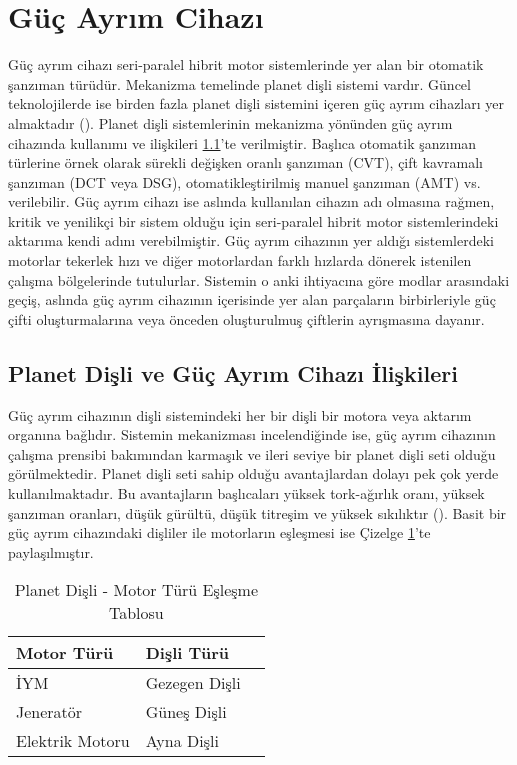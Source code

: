 \section{Güç Ayrım Cihazı}
\label{gucayrimcihazi}
Güç ayrım cihazı seri-paralel hibrit motor sistemlerinde yer alan bir otomatik şanzıman türüdür. Mekanizma temelinde
planet dişli sistemi vardır. Güncel teknolojilerde ise birden fazla planet dişli sistemini içeren güç ayrım cihazları yer almaktadır (\cite{gucayrimcihaziref}).
Planet dişli sistemlerinin mekanizma yönünden güç ayrım cihazında kullanımı ve ilişkileri \ref{PlanetDisliLiteratur}'te verilmiştir.
Başlıca otomatik şanzıman türlerine örnek olarak sürekli değişken oranlı şanzıman (CVT), çift kavramalı şanzıman (DCT veya DSG), otomatikleştirilmiş manuel şanzıman (AMT) vs. verilebilir.
Güç ayrım cihazı ise aslında kullanılan cihazın adı olmasına rağmen, kritik ve yenilikçi bir sistem olduğu için seri-paralel hibrit motor sistemlerindeki aktarıma kendi adını 
verebilmiştir. Güç ayrım cihazının yer aldığı sistemlerdeki motorlar tekerlek hızı ve diğer motorlardan farklı
hızlarda dönerek istenilen çalışma bölgelerinde tutulurlar. Sistemin o anki ihtiyacına göre modlar arasındaki geçiş, aslında güç ayrım 
cihazının içerisinde yer alan parçaların birbirleriyle güç çifti oluşturmalarına veya önceden oluşturulmuş çiftlerin ayrışmasına dayanır. 


\subsection{Planet Dişli ve Güç Ayrım Cihazı İlişkileri}
\label{PlanetDisliLiteratur}

Güç ayrım cihazının dişli sistemindeki her bir dişli bir motora veya aktarım organına bağlıdır. Sistemin mekanizması incelendiğinde ise, güç ayrım cihazının çalışma prensibi bakımından
karmaşık ve ileri seviye bir planet dişli seti olduğu görülmektedir. Planet dişli seti sahip olduğu avantajlardan dolayı pek çok yerde kullanılmaktadır. Bu avantajların başlıcaları
yüksek tork-ağırlık oranı, yüksek şanzıman oranları, düşük gürültü, düşük titreşim ve yüksek sıkılıktır (\cite{planetdislireferans}). Basit bir güç ayrım cihazındaki dişliler ile motorların eşleşmesi ise Çizelge \ref{tab:planetdisliisimlertablo}'te paylaşılmıştır.

\begin{table}
    \centering
    \caption{Planet Dişli - Motor Türü Eşleşme Tablosu}\label{tab:planetdisliisimlertablo}
    \begin{tabular}{|l|l|l|}
    \hline
    \textbf{Motor Türü}      &\textbf{Dişli Türü}     \\ \hline
    İYM                      & Gezegen Dişli          \\ \hline
    Jeneratör                & Güneş Dişli            \\ \hline
    Elektrik Motoru          & Ayna Dişli             \\ \hline
\end{tabular}
\end{table}

